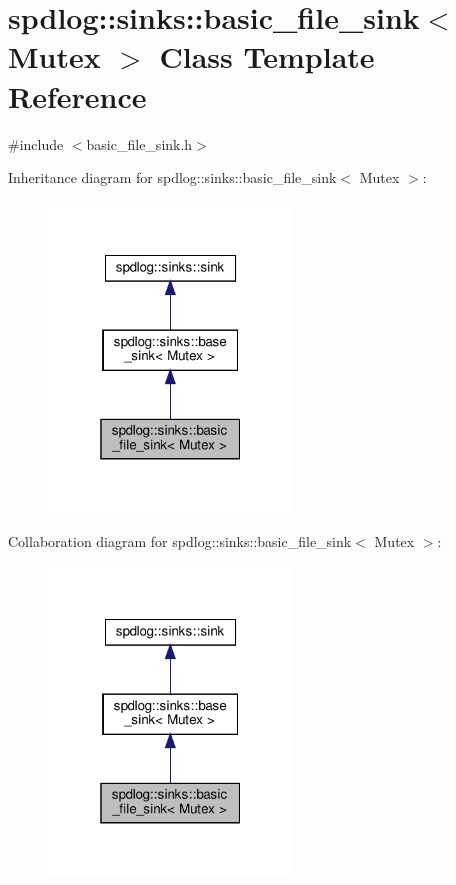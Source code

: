 \hypertarget{classspdlog_1_1sinks_1_1basic__file__sink}{}\section{spdlog\+:\+:sinks\+:\+:basic\+\_\+file\+\_\+sink$<$ Mutex $>$ Class Template Reference}
\label{classspdlog_1_1sinks_1_1basic__file__sink}


{\ttfamily \#include $<$basic\+\_\+file\+\_\+sink.\+h$>$}



Inheritance diagram for spdlog\+:\+:sinks\+:\+:basic\+\_\+file\+\_\+sink$<$ Mutex $>$\+:
\nopagebreak
\begin{figure}[H]
\begin{center}
\leavevmode
\includegraphics[width=184pt]{classspdlog_1_1sinks_1_1basic__file__sink__inherit__graph}
\end{center}
\end{figure}


Collaboration diagram for spdlog\+:\+:sinks\+:\+:basic\+\_\+file\+\_\+sink$<$ Mutex $>$\+:
\nopagebreak
\begin{figure}[H]
\begin{center}
\leavevmode
\includegraphics[width=184pt]{classspdlog_1_1sinks_1_1basic__file__sink__coll__graph}
\end{center}
\end{figure}
